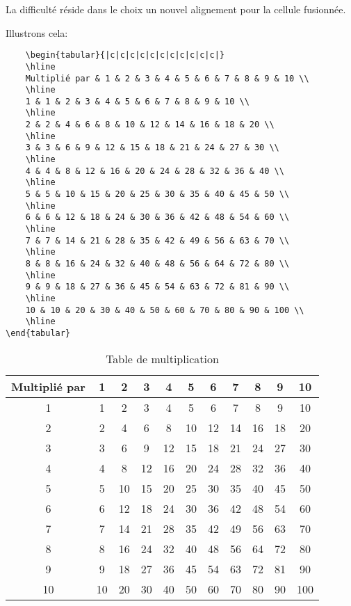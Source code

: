 La difficulté réside dans le choix un nouvel alignement pour la cellule fusionnée.
\medskip

Illustrons cela:
\begin{verbatim}
    \begin{tabular}{|c|c|c|c|c|c|c|c|c|c|c|}
    \hline
    Multiplié par & 1 & 2 & 3 & 4 & 5 & 6 & 7 & 8 & 9 & 10 \\
    \hline
    1 & 1 & 2 & 3 & 4 & 5 & 6 & 7 & 8 & 9 & 10 \\
    \hline
    2 & 2 & 4 & 6 & 8 & 10 & 12 & 14 & 16 & 18 & 20 \\
    \hline
    3 & 3 & 6 & 9 & 12 & 15 & 18 & 21 & 24 & 27 & 30 \\
    \hline
    4 & 4 & 8 & 12 & 16 & 20 & 24 & 28 & 32 & 36 & 40 \\
    \hline
    5 & 5 & 10 & 15 & 20 & 25 & 30 & 35 & 40 & 45 & 50 \\
    \hline
    6 & 6 & 12 & 18 & 24 & 30 & 36 & 42 & 48 & 54 & 60 \\
    \hline
    7 & 7 & 14 & 21 & 28 & 35 & 42 & 49 & 56 & 63 & 70 \\
    \hline
    8 & 8 & 16 & 24 & 32 & 40 & 48 & 56 & 64 & 72 & 80 \\
    \hline
    9 & 9 & 18 & 27 & 36 & 45 & 54 & 63 & 72 & 81 & 90 \\
    \hline
    10 & 10 & 20 & 30 & 40 & 50 & 60 & 70 & 80 & 90 & 100 \\
    \hline 
\end{tabular}
\end{verbatim}
\begin{table}[!h]
\begin{center}
\begin{tabular}{|c|c|c|c|c|c|c|c|c|c|c|}
\hline
Multiplié par & 1 & 2 & 3 & 4 & 5 & 6 & 7 & 8 & 9 & 10 \\
\hline
1 & 1 & 2 & 3 & 4 & 5 & 6 & 7 & 8 & 9 & 10 \\
\hline
2 & 2 & 4 & 6 & 8 & 10 & 12 & 14 & 16 & 18 & 20 \\
\hline
3 & 3 & 6 & 9 & 12 & 15 & 18 & 21 & 24 & 27 & 30 \\
\hline
4 & 4 & 8 & 12 & 16 & 20 & 24 & 28 & 32 & 36 & 40 \\
\hline
5 & 5 & 10 & 15 & 20 & 25 & 30 & 35 & 40 & 45 & 50 \\
\hline
6 & 6 & 12 & 18 & 24 & 30 & 36 & 42 & 48 & 54 & 60 \\
\hline
7 & 7 & 14 & 21 & 28 & 35 & 42 & 49 & 56 & 63 & 70 \\
\hline
8 & 8 & 16 & 24 & 32 & 40 & 48 & 56 & 64 & 72 & 80 \\
\hline
9 & 9 & 18 & 27 & 36 & 45 & 54 & 63 & 72 & 81 & 90 \\
\hline
10 & 10 & 20 & 30 & 40 & 50 & 60 & 70 & 80 & 90 & 100 \\
\hline
\end{tabular}
\caption{Table de multiplication}
\end{center}
\end{table}
\medskip

